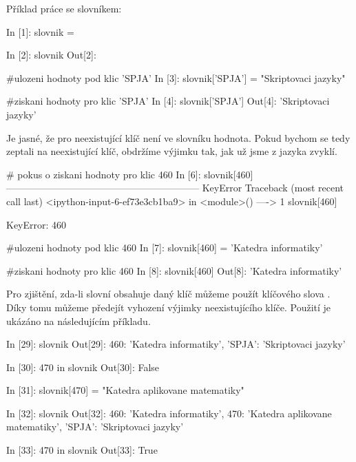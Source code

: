 \noindent
Příklad práce se slovníkem:

\begin{python}
In [1]: slovnik = {}

In [2]: slovnik
Out[2]: {}

#ulozeni hodnoty pod klic 'SPJA'
In [3]: slovnik['SPJA'] = "Skriptovaci jazyky"

#ziskani hodnoty pro klic 'SPJA'
In [4]: slovnik['SPJA']
Out[4]: 'Skriptovaci jazyky'    
\end{python}

Je jasné, že pro neexistující klíč není ve slovníku hodnota. Pokud bychom se tedy zeptali na neexistující klíč,
obdržíme výjimku  tak, jak už jsme z jazyka zvyklí.

\begin{python}
# pokus o ziskani hodnoty pro klic 460
In [6]: slovnik[460]
------------------------------------------------------------
KeyError                   Traceback (most recent call last)
<ipython-input-6-ef73e3cb1ba9> in <module>()
----> 1 slovnik[460]

KeyError: 460

#ulozeni hodnoty pod klic 460
In [7]: slovnik[460] = 'Katedra informatiky'

#ziskani hodnoty pro klic 460
In [8]: slovnik[460]
Out[8]: 'Katedra informatiky'
\end{python}

Pro zjištění, zda-li slovní obsahuje daný klíč můžeme použít klíčového slova .
Díky tomu můžeme předejít vyhození výjimky neexistujícího klíče.
Použití je ukázáno
na následujícím příkladu.

\begin{python}
In [29]: slovnik
Out[29]:
{460: 'Katedra informatiky',
 'SPJA': 'Skriptovaci jazyky'}

In [30]: 470 in slovnik
Out[30]: False

In [31]: slovnik[470] = "Katedra aplikovane matematiky"

In [32]: slovnik
Out[32]: 
{460: 'Katedra informatiky',
 470: 'Katedra aplikovane matematiky',
 'SPJA': 'Skriptovaci jazyky'}

In [33]: 470 in slovnik
Out[33]: True
\end{python}



